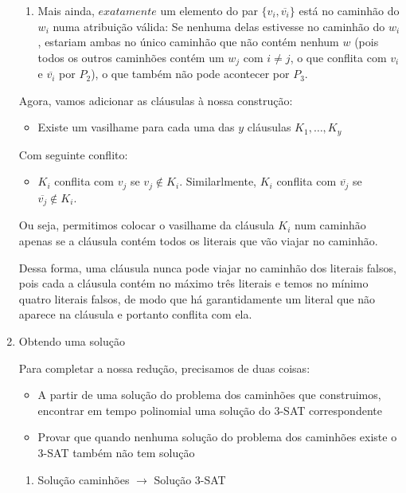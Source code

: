 \documentclass[11pt]{article}
\begin{document}
\begin{enumerate}
\begin{enumerate}[($P_1$)]
\item Mais ainda, $\textit{exatamente}$ um elemento do par $\{v_i,
\overline{v_i}\}$ está no caminhão do $w_i$ numa atribuição válida: Se
nenhuma delas estivesse no caminhão do $w_i$, estariam ambas no único
caminhão que não contém nenhum $w$ (pois todos os outros caminhões
contém um $w_j$ com $i \neq j$, o que conflita com $v_i$ e
$\overline{v_i}$ por $P_2$), o que também não pode acontecer por $P_3$.
\end{enumerate}



Agora, vamos adicionar as cláusulas à nossa construção:

\begin{itemize}
\item Existe um vasilhame para cada uma das $y$ cláusulas $K_1, \ldots, K_y$
\end{itemize}

Com seguinte conflito:

\begin{itemize}
\item $K_i$ conflita com $v_j$ se $v_j \not\in K_i$. Similarlmente, $K_i$
  conflita com $\overline{v_j}$ se $\overline{v_j} \not\in K_i$.
\end{itemize}

Ou seja, permitimos colocar o vasilhame da cláusula $K_i$ num caminhão
apenas se a cláusula contém todos os literais que vão viajar no
caminhão.

Dessa forma, uma cláusula nunca pode viajar no caminhão dos literais
falsos, pois cada a cláusula contém no máximo três literais e temos no
mínimo quatro literais falsos, de modo que há garantidamente um
literal que não aparece na cláusula e portanto conflita com ela.

\item Obtendo uma solução
\label{sec-6-3-3-2}

Para completar a nossa redução, precisamos de duas coisas:
\begin{itemize}
\item A partir de uma solução do problema dos caminhões que construimos,
encontrar em tempo polinomial uma solução do 3-SAT correspondente
\item Provar que quando nenhuma solução do problema dos caminhões existe o
3-SAT também não tem solução
\end{itemize}

\begin{enumerate}
\item Solução caminhões $\to$ Solução 3-SAT
\label{sec-6-3-3-2-1}


\end{enumerate}
\end{enumerate}
\end{document}
